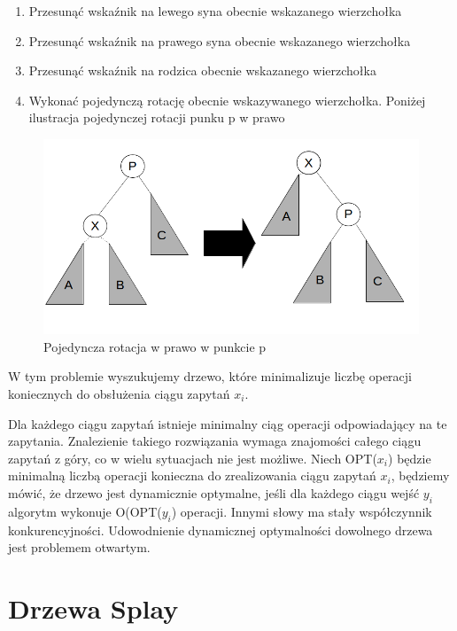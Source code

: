 \documentclass[declaration,shortabstract]{iithesis}
\theoremstyle{remark}
\theoremstyle{plain}
\theoremstyle{plain}
\theoremstyle{plain}
\begin{document}
\begin{enumerate}  

\item {Przesunąć wskaźnik na lewego syna obecnie wskazanego wierzchołka}  

\item {Przesunąć wskaźnik na prawego syna obecnie wskazanego wierzchołka}  

\item {Przesunąć wskaźnik na rodzica obecnie wskazanego wierzchołka}  

\item {Wykonać pojedynczą rotację obecnie wskazywanego wierzchołka. Poniżej ilustracja pojedynczej rotacji punku p w prawo}   

\end{enumerate}   
\begin{figure}
  \centering
    \includegraphics[scale = 0.5]{zig.png}
  \caption{Pojedyncza rotacja w prawo w punkcie p}
  \label{fig:1}
\end{figure}


W tym problemie wyszukujemy drzewo, które minimalizuje liczbę operacji koniecznych do obsłużenia ciągu zapytań \(x_i\).  

Dla każdego ciągu zapytań istnieje minimalny ciąg operacji odpowiadający na te zapytania. Znalezienie takiego rozwiązania wymaga znajomości całego ciągu zapytań z góry, co w wielu sytuacjach nie jest możliwe. Niech OPT(\(x_i\)) będzie minimalną liczbą operacji konieczna do zrealizowania ciągu zapytań \(x_i\), będziemy mówić, że drzewo jest dynamicznie optymalne, jeśli dla każdego ciągu wejść \(y_i\) algorytm wykonuje O(OPT(\(y_i\)) operacji. Innymi słowy ma stały współczynnik konkurencyjności. Udowodnienie dynamicznej optymalności dowolnego drzewa jest problemem otwartym.  

\chapter{Drzewa Splay}  
\end{document}
